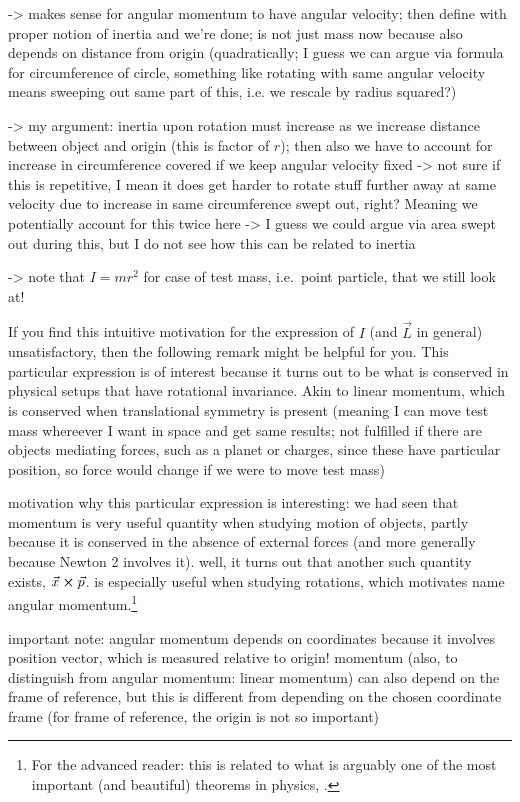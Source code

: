 \documentclass[../class_mech_main.tex]{subfiles}
\begin{document}
-> makes sense for angular momentum to have angular velocity; then define with proper notion of inertia and we're done; is not just mass now because also depends on distance from origin (quadratically; I guess we can argue via formula for circumference of circle, something like rotating with same angular velocity means sweeping out same part of this, i.e. we rescale by radius squared?)

-> my argument: inertia upon rotation must increase as we increase distance between object and origin (this is factor of $r$); then also we have to account for increase in circumference covered if we keep angular velocity fixed -> not sure if this is repetitive, I mean it does get harder to rotate stuff further away at same velocity due to increase in same circumference swept out, right? Meaning we potentially account for this twice here -> I guess we could argue via area swept out during this, but I do not see how this can be related to inertia

-> note that $I = m r^2$ for case of test mass, i.e.~point particle, that we still look at!


If you find this intuitive motivation for the expression of $I$ (and $\vec{L}$ in general) unsatisfactory, then the following remark might be helpful for you. This particular expression is of interest because it turns out to be what is conserved in physical setups that have rotational invariance. Akin to linear momentum, which is conserved when translational symmetry is present (meaning I can move test mass whereever I want in space and get same results; not fulfilled if there are objects mediating forces, such as a planet or charges, since these have particular position, so force would change if we were to move test mass)


motivation why this particular expression is interesting: we had seen that momentum is very useful quantity when studying motion of objects, partly because it is conserved in the absence of external forces (and more generally because Newton 2 involves it). well, it turns out that another such quantity exists, $\vec{x} \cross \vec{p}$. is especially useful when studying rotations, which motivates name angular momentum.\footnote{For the advanced reader: this is related to what is arguably one of the most important (and beautiful) theorems in physics, .}

important note: angular momentum depends on coordinates because it involves position vector, which is measured relative to origin! momentum (also, to distinguish from angular momentum: linear momentum) can also depend on the frame of reference, but this is different from depending on the chosen coordinate frame (for frame of reference, the origin is not so important)
\end{document}
